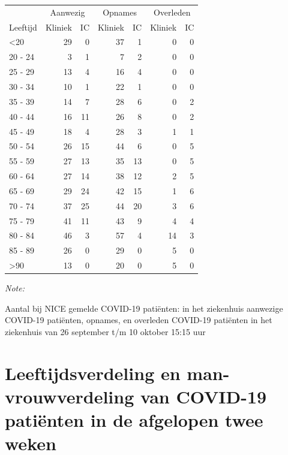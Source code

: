 \documentclass[
  english,
  man,floatsintext]{apa6}
\begin{document}
\begin{table}
\centering\begingroup\fontsize{10}{12}\selectfont

\begin{threeparttable}
\begin{tabular}{lrrrrrr}
\toprule
\multicolumn{1}{c}{ } & \multicolumn{2}{c}{Aanwezig} & \multicolumn{2}{c}{Opnames} & \multicolumn{2}{c}{Overleden} \\
\cmidrule(l{3pt}r{3pt}){2-3} \cmidrule(l{3pt}r{3pt}){4-5} \cmidrule(l{3pt}r{3pt}){6-7}
Leeftijd & Kliniek & IC & Kliniek & IC & Kliniek & IC\\
\midrule
<20 & 29 & 0 & 37 & 1 & 0 & 0\\
20 - 24 & 3 & 1 & 7 & 2 & 0 & 0\\
25 - 29 & 13 & 4 & 16 & 4 & 0 & 0\\
30 - 34 & 10 & 1 & 22 & 1 & 0 & 0\\
35 - 39 & 14 & 7 & 28 & 6 & 0 & 2\\
40 - 44 & 16 & 11 & 26 & 8 & 0 & 2\\
45 - 49 & 18 & 4 & 28 & 3 & 1 & 1\\
50 - 54 & 26 & 15 & 44 & 6 & 0 & 5\\
55 - 59 & 27 & 13 & 35 & 13 & 0 & 5\\
60 - 64 & 27 & 14 & 38 & 12 & 2 & 5\\
65 - 69 & 29 & 24 & 42 & 15 & 1 & 6\\
70 - 74 & 37 & 25 & 44 & 20 & 3 & 6\\
75 - 79 & 41 & 11 & 43 & 9 & 4 & 4\\
80 - 84 & 46 & 3 & 57 & 4 & 14 & 3\\
85 - 89 & 26 & 0 & 29 & 0 & 5 & 0\\
>90 & 13 & 0 & 20 & 0 & 5 & 0\\
\bottomrule
\end{tabular}
\begin{tablenotes}
\item \textit{Note: } 
\item Aantal bij NICE gemelde COVID-19 patiënten: in het ziekenhuis aanwezige COVID-19 patiënten, opnames, en overleden COVID-19 patiënten in het ziekenhuis van 26 september t/m 10 oktober 15:15 uur
\end{tablenotes}
\end{threeparttable}
\endgroup{}
\end{table}

\newpage

\hypertarget{leeftijdsverdeling-en-man-vrouwverdeling-van-covid-19-patiuxebnten-in-de-afgelopen-twee-weken}{%
\section{Leeftijdsverdeling en man-vrouwverdeling van COVID-19 patiënten in de afgelopen twee weken}\label{leeftijdsverdeling-en-man-vrouwverdeling-van-covid-19-patiuxebnten-in-de-afgelopen-twee-weken}}
\end{document}
